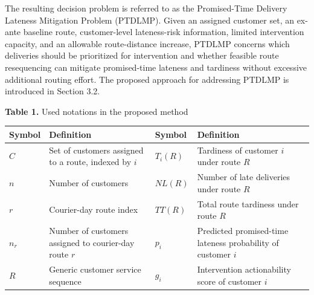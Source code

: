 \documentclass[
]{article}
\newcounter{none} %
\begin{document}
The resulting decision problem is referred to as the Promised-Time
Delivery Lateness Mitigation Problem (PTDLMP). Given an assigned
customer set, an ex-ante baseline route, customer-level lateness-risk
information, limited intervention capacity, and an allowable
route-distance increase, PTDLMP concerns which deliveries should be
prioritized for intervention and whether feasible route resequencing can
mitigate promised-time lateness and tardiness without excessive
additional routing effort. The proposed approach for addressing PTDLMP
is introduced in Section 3.2.

\textbf{Table 1.} Used notations in the proposed method

{\def\LTcaptype{none} %
\begin{longtable}[]{@{}
  >{\raggedright\arraybackslash}p{}
  >{\raggedright\arraybackslash}p{}
  >{\raggedright\arraybackslash}p{}
  >{\raggedright\arraybackslash}p{}@{}}
\toprule\noalign{}
\begin{minipage}[b]{\linewidth}\centering
\textbf{Symbol}
\end{minipage} & \begin{minipage}[b]{\linewidth}\centering
\textbf{Definition}
\end{minipage} & \begin{minipage}[b]{\linewidth}\centering
\textbf{Symbol}
\end{minipage} & \begin{minipage}[b]{\linewidth}\centering
\textbf{Definition}
\end{minipage} \\
\midrule\noalign{}
\endhead
\bottomrule\noalign{}
\endlastfoot
\(C\) & Set of customers assigned to a route, indexed by \(i\ \) &
\(T_{i}(R)\) & Tardiness of customer \(i\) under route \(R\) \\
\(n\) & Number of customers & \(NL(R)\) & Number of late deliveries
under route \(R\) \\
\(r\) & Courier-day route index & \(TT(R)\) & Total route tardiness
under route \(R\) \\
\(n_{r}\) & Number of customers assigned to courier-day route \(r\) &
\(p_{i}\) & Predicted promised-time lateness probability of customer
\(i\) \\
\(R\) & Generic customer service sequence & \(g_{i}\) & Intervention
actionability score of customer \(i\) \\

\end{longtable}}
\end{document}
